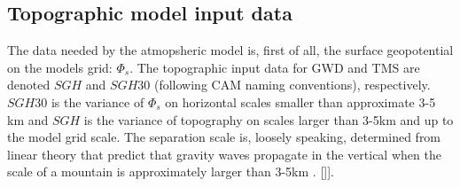 \documentclass[gmd]{copernicus}
\begin{document}

\subsection{Topographic model input data}
The data needed by the atmopsheric model is, first of all, the surface geopotential on the models grid: $\Phi_s$. The topographic input data for GWD and TMS are denoted $SGH$ and $SGH30$ (following CAM naming conventions), respectively. $SGH30$ is the variance of $\Phi_s$ on horizontal scales smaller than approximate 3-5 km and $SGH$ is the variance of topography on scales larger than 3-5km and up to the model grid scale. The separation scale is, loosely speaking, determined from linear theory that predict that gravity waves propagate in the vertical when the scale of a mountain is approximately larger than 3-5km \citep[e.g.,][]{Durran,BBW2004QJRMS}. 
[{\color{red}{we could consider showing some results - especially since CAM5.4/5 is using the new topo}}]].

\end{document}

